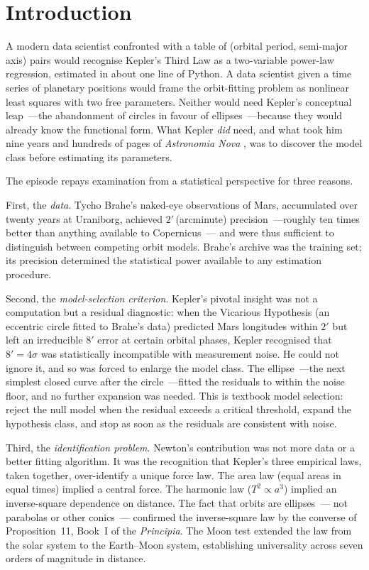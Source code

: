 \documentclass[12pt]{article}
\begin{document}
\section{Introduction}

A modern data scientist confronted with a table of (orbital period, semi-major
axis) pairs would recognise Kepler's Third Law as a two-variable power-law
regression, estimated in about one line of Python.
A data scientist given a time series of planetary positions would frame the
orbit-fitting problem as nonlinear least squares with two free parameters.
Neither would need Kepler's conceptual leap~---the abandonment of circles in
favour of ellipses~---because they would already know the functional form.
What Kepler \emph{did} need, and what took him nine years and hundreds of pages
of \emph{Astronomia Nova} \citep{Donahue1992}, was to discover the model class
before estimating its parameters.

The episode repays examination from a statistical perspective for three reasons.

First, the \emph{data}.  Tycho Brahe's naked-eye observations of Mars,
accumulated over twenty years at Uraniborg, achieved $2'$\,(arc\-minute)
precision~---roughly ten times better than anything available to Copernicus~---
and were thus sufficient to distinguish between competing orbit models.
Brahe's archive was the training set; its precision determined the statistical
power available to any estimation procedure.

Second, the \emph{model-selection criterion}.
Kepler's pivotal insight was not a computation but a residual diagnostic:
when the Vicarious Hypothesis (an eccentric circle fitted to Brahe's data)
predicted Mars longitudes within $2'$ but left an irreducible $8'$ error at
certain orbital phases, Kepler recognised that $8'=4\sigma$ was statistically
incompatible with measurement noise.
He could not ignore it, and so was forced to enlarge the model class.
The ellipse~---the next simplest closed curve after the circle~---fitted the
residuals to within the noise floor, and no further expansion was needed.
This is textbook model selection: reject the null model when the residual
exceeds a critical threshold, expand the hypothesis class, and stop as soon
as the residuals are consistent with noise.

Third, the \emph{identification problem}.
Newton's contribution was not more data or a better fitting algorithm.
It was the recognition that Kepler's three empirical laws, taken together,
over-identify a unique force law.
The area law (equal areas in equal times) implied a central force.
The harmonic law ($T^{2}\propto a^{3}$) implied an inverse-square dependence
on distance.
The fact that orbits are ellipses~--- not parabolas or other conics~---
confirmed the inverse-square law by the converse of Proposition~11, Book~I
of the \emph{Principia}.
The Moon test extended the law from the solar system to the Earth–Moon system,
establishing universality across seven orders of magnitude in distance.
\end{document}
